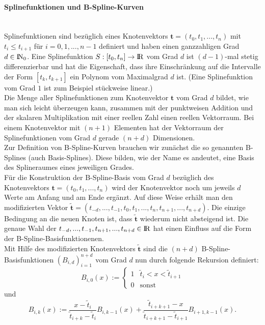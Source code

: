 \documentclass{article}
\newcommand{\R}{{\rm I\!R}}
\newcommand{\N}{{\rm I\!N}}
\begin{document}
\paragraph{Splinefunktionen und B-Spline-Kurven}~\\
Splinefunktionen sind bezüglich eines Knotenvektors $\mathbf{t}=(t_0,t_1,...,t_n)$ mit $t_i \le t_{i+1}$ für $i=0,1,...,n-1$ definiert und haben einen ganzzahligen Grad $d\in\N_0$. Eine Splinefunktion $S:[t_0,t_n]\rightarrow\R$ vom Grad $d$ ist $(d-1)$-mal stetig differenzierbar und hat die Eigenschaft, dass ihre Einschränkung auf die Intervalle der Form $[t_k,t_{k+1}]$ ein Polynom vom Maximalgrad $d$ ist. (Eine Splinefunktion vom Grad $1$ ist zum Beispiel stückweise linear.)\\
Die Menge aller Splinefunktionen zum Knotenvektor $\mathbf{t}$ vom Grad $d$
bildet, wie man sich leicht überzeugen kann, zusammen mit der punktweisen Addition und der skalaren Multiplikation mit einer reellen Zahl einen reellen Vektorraum. Bei einem Knotenvektor mit $(n+1)$ Elementen hat der Vektorraum der Splinefunktionen vom Grad $d$ gerade $(n+d)$ Dimensionen.\\

\noindent Zur Definition von B-Spline-Kurven brauchen wir zunächst die so genannten B-Splines (auch Basis-Splines). Diese bilden, wie der Name es andeutet, eine Basis des Splineraumes eines jeweiligen Grades.\\
Für die Konstruktion der B-Spline-Basis vom Grad $d$ bezüglich des Knotenvektors $\mathbf{t}=(t_0,t_1,...,t_n)$ wird der Knotenvektor noch um jeweils $d$ Werte am Anfang und am Ende ergänzt. Auf diese Weise erhält man den modifizierten Vektor $\mathbf{\tilde{t}}=(t_{-d},...,t_{-1},t_0,t_1,...,t_n,t_{n+1},...,t_{n+d})$. Die einzige Bedingung an die neuen Knoten ist, dass $\mathbf{\tilde{t}}$ wiederum nicht absteigend ist. Die genaue Wahl der $t_{-d},...,t_{-1},t_{n+1},...,t_{n+d}\in\R$ hat einen Einfluss auf die Form der B-Spline-Basisfunktionenen.\\
Mit Hilfe des modifizierten Knotenvektors $\mathbf{\tilde{t}}$ sind die $(n+d)$ B-Spline-Basisfunktionen $(B_{i,d})_{i=1}^{n+d}$ vom Grad $d$ nun durch folgende Rekursion definiert:
\[
B_{i,0}(x) := \begin{cases} 1& \tilde{t}_i<x<\tilde{t}_{i+1} \\ 0& \text{sonst} \end{cases}
\]
und
\[
B_{i,k}(x) := \frac{x-\tilde{t}_i}{\tilde{t}_{i+k}-\tilde{t}_i}B_{i,k-1}(x) + \frac{\tilde{t}_{i+k+1}-x}{\tilde{t}_{i+k+1}-\tilde{t}_{i+1}}B_{i+1,k-1}(x).
\]
\\
\end{document}
